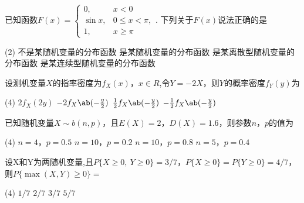 \begin{problem}
    已知函数$F(x)=
    \begin{cases}
        0,      & x<0\\
        \sin x, & 0\leq x<\pi,\\
        1,      & x\geq\pi
    \end{cases}$.
    下列关于$F(x)$说法正确的是
    \begin{tasks}(2)
        \task 不是某随机变量的分布函数
        \task 是某随机变量的分布函数
        \task 是某离散型随机变量的分布函数
        \task 是某连续型随机变量的分布函数
    \end{tasks}
\end{problem}
\begin{solution}

\end{solution}

\begin{problem}
    设测机变量$X$的指率密度为$f_X(x)$，$x\in R$,令$Y=-2X$，则$Y$的概率密度$f_Y(y)$为
    \begin{tasks}(4)
        \task $2f_X(2y)$
        \task $-2f_X\ab(-\frac y2)$
        \task $\frac12f_X\ab(-\frac y2)$
        \task $-\frac12f_X\ab(-\frac y2)$
    \end{tasks}
\end{problem}
\begin{solution}

\end{solution}


\begin{problem}
    已知随机变量$X\sim b(n,p)$，且$E(X)=2$，$D(X)=1.6$，则参数$n$，$p$的值为
\begin{tasks}(4)
    \task $n=4$，$p=0.5$
    \task $n=10$，$p=0.2$
    \task $n=10$，$p=0.8$
    \task $n=5$，$p=0.4$
\end{tasks}

\end{problem}
\begin{solution}

\end{solution}

\begin{problem}
    设X和Y为两随机变量,且$P\{X\geq0,\ Y\geq0\}=3/7$，$P\{X\geq0\}=P\{Y\geq0\}=4/7$，则$P\{\max(X,Y)\geq0\}=$
    \begin{tasks}(4)
        \task $1/7$
        \task $2/7$
        \task $3/7$
        \task $5/7$
    \end{tasks}
\end{problem}
\begin{solution}

\end{solution}

